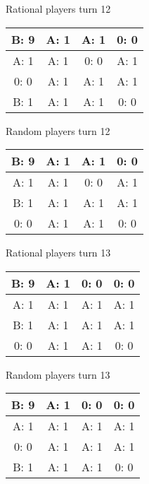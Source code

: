 \documentclass[12pt]{article}
\begin{document}
Rational players turn 12
\begin{center}
\begin{tabular}{|c|c|c|c|} 
\hline
B: 9  & A: 1  & A: 1  & 0: 0  \\ \hline
A: 1  & A: 1  & 0: 0  & A: 1  \\ \hline
0: 0  & A: 1  & A: 1  & A: 1  \\ \hline
B: 1  & A: 1  & A: 1  & 0: 0  \\ \hline
\end{tabular} 
\end{center}
Random players turn 12
\begin{center}
\begin{tabular}{|c|c|c|c|} 
\hline
B: 9  & A: 1  & A: 1  & 0: 0  \\ \hline
A: 1  & A: 1  & 0: 0  & A: 1  \\ \hline
B: 1  & A: 1  & A: 1  & A: 1  \\ \hline
0: 0  & A: 1  & A: 1  & 0: 0  \\ \hline
\end{tabular} 
\end{center}

Rational players turn 13
\begin{center}
\begin{tabular}{|c|c|c|c|} 
\hline
B: 9  & A: 1  & 0: 0  & 0: 0  \\ \hline
A: 1  & A: 1  & A: 1  & A: 1  \\ \hline
B: 1  & A: 1  & A: 1  & A: 1  \\ \hline
0: 0  & A: 1  & A: 1  & 0: 0  \\ \hline
\end{tabular} 
\end{center}
Random players turn 13
\begin{center}
\begin{tabular}{|c|c|c|c|} 
\hline
B: 9  & A: 1  & 0: 0  & 0: 0  \\ \hline
A: 1  & A: 1  & A: 1  & A: 1  \\ \hline
0: 0  & A: 1  & A: 1  & A: 1  \\ \hline
B: 1  & A: 1  & A: 1  & 0: 0  \\ \hline
\end{tabular} 
\end{center}
\end{document}
